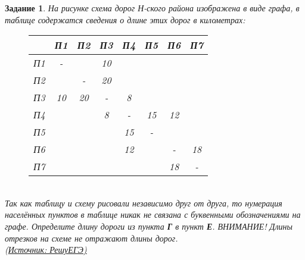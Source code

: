 \documentclass[12pt]{article}
\theoremstyle{problem_style}
\newtheorem{problem}{Задание}[subsection]
\begin{document}
\begin{problem}
На рисунке схема дорог Н-ского района изображена в виде графа, в таблице содержатся сведения о длине этих дорог в километрах:
\begin{figure}[h]
    \centering
    \begin{minipage}[t!]{0.45\textwidth}
        \centering
        \begin{tabular}{|c|c|c|c|c|c|c|c|} \hline
             & П1 & П2 & П3 & П4 & П5 & П6 & П7 \\ \hline
            П1 & - & & 10 &  & &  & \\ \hline
            П2 &  & - & 20 &  & &  & \\ \hline
            П3 & 10 & 20 & - & 8 &  &  & \\ \hline
            П4 & & & 8 & - & 15 & 12 & \\ \hline
            П5 & & & & 15 & - & & \\ \hline
            П6 & & & & 12 & & - & 18 \\ \hline
            П7 & & & & & & 18 & -\\ \hline
        \end{tabular}
    \end{minipage}
    \hfill
    \begin{minipage}[t!]{0.45\textwidth}
        \centering
    \end{minipage}
\end{figure}\\
Так как таблицу и схему рисовали независимо друг от друга, то нумерация населённых пунктов в таблице никак не связана с буквенными обозначениями на графе. Определите длину дороги из пункта \textbf{Г} в пункт \textbf{Е}. ВНИМАНИЕ! Длины отрезков на схеме не отражают длины дорог. \\
(\href{https://inf-ege.sdamgia.ru/}{Источник: РешуЕГЭ)} %
\end{problem}
\end{document}
